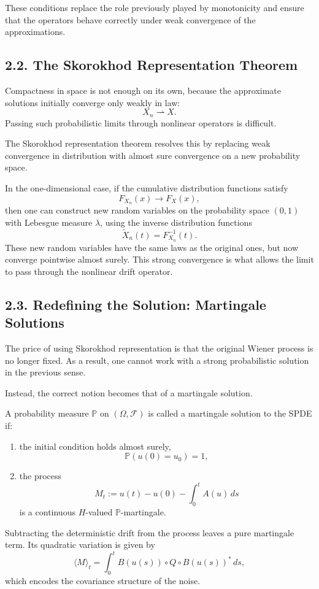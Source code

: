 \documentclass[11pt]{article}
\theoremstyle{definition}
\theoremstyle{remark}
\begin{document}
These conditions replace the role previously played by monotonicity and ensure that the operators behave correctly under weak convergence of the approximations.

\subsection*{2.2. The Skorokhod Representation Theorem}
Compactness in space is not enough on its own, because the approximate solutions initially converge only weakly in law:
\[
X_n \rightharpoonup X.
\]
Passing such probabilistic limits through nonlinear operators is difficult.

The Skorokhod representation theorem resolves this by replacing weak convergence in distribution with almost sure convergence on a new probability space.

In the one-dimensional case, if the cumulative distribution functions satisfy
\[
F_{X_n}(x)\to F_X(x),
\]
then one can construct new random variables on the probability space \((0,1)\) with Lebesgue measure \(\lambda\), using the inverse distribution functions
\[
\widetilde X_n(t)=F_{X_n}^{-1}(t).
\]
These new random variables have the same laws as the original ones, but now converge pointwise almost surely. This strong convergence is what allows the limit to pass through the nonlinear drift operator.

\subsection*{2.3. Redefining the Solution: Martingale Solutions}
The price of using Skorokhod representation is that the original Wiener process is no longer fixed. As a result, one cannot work with a strong probabilistic solution in the previous sense.

Instead, the correct notion becomes that of a martingale solution.

A probability measure \(\mathbb P\) on \((\Omega,\mathcal F)\) is called a martingale solution to the SPDE if:
\begin{enumerate}
\item the initial condition holds almost surely,
\[
\mathbb P(u(0)=u_0)=1,
\]
\item the process
\[
M_t:=u(t)-u(0)-\int_0^t A(u)\,ds
\]
is a continuous \(H\)-valued \(\mathbb P\)-martingale.
\end{enumerate}

Subtracting the deterministic drift from the process leaves a pure martingale term. Its quadratic variation is given by
\[
\langle M\rangle_t
=
\int_0^t B(u(s))\circ Q\circ B(u(s))^*\,ds,
\]
which encodes the covariance structure of the noise.
\end{document}
